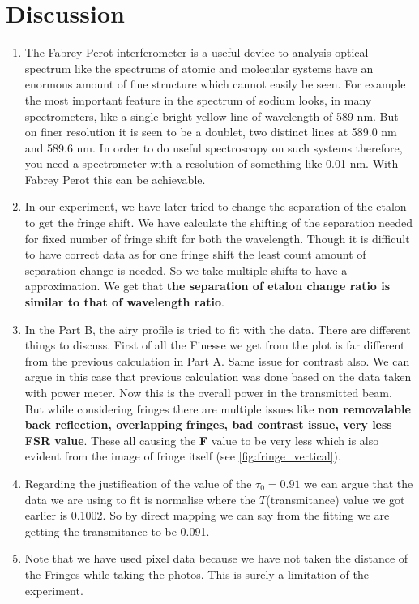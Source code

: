 \section{Discussion}
\begin{enumerate}
    \item The Fabrey Perot interferometer is a useful device to analysis optical spectrum like the spectrums of atomic and molecular systems have an enormous amount of fine structure which cannot easily be seen. For example the most important feature in the spectrum of sodium looks, in many spectrometers, like a single bright yellow line of wavelength of 589 nm. But on finer resolution it is seen to be a doublet, two distinct lines at 589.0 nm and 589.6 nm. In order to do useful spectroscopy on such systems therefore, you need a spectrometer with a resolution of something like 0.01 nm. With Fabrey Perot this can be achievable.
    \item In our experiment, we have later tried to change the separation of the etalon to get the fringe shift. We have calculate the shifting of the separation needed for fixed number of fringe shift for both the wavelength. Though it is difficult to have correct data as for one fringe shift the least count amount of separation change is needed. So we take multiple shifts to have a approximation. We get that \textbf{the separation of etalon change ratio is similar to that of wavelength ratio}.
    \item In the Part B, the airy profile is tried to fit with the data. There are different things to discuss. First of all the Finesse we get from the plot is far different from the previous calculation in Part A. Same issue for contrast also. We can argue in this case that previous calculation was done based on the data taken with power meter. Now this is the overall power in the transmitted beam. But while considering fringes there are multiple issues like \textbf{non removalable back reflection, overlapping fringes, bad contrast issue, very less FSR value}. These all causing the \textbf{F} value to be very less which is also evident from the image of fringe itself (see \cref{fig:fringe_vertical}).
    \item Regarding the justification of the value of the $\tau_0 = 0.91$ we can argue that the data we are using to fit is normalise where the $T$(transmitance) value we got earlier is 0.1002. So by direct mapping we can say from the fitting we are getting the transmitance to be 0.091.
    \item Note that we have used pixel data because we have not taken the distance of the Fringes while taking the photos. This is surely a limitation of the experiment.
\end{enumerate}
